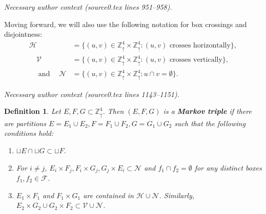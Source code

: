 \documentclass[10pt,a4paper]{amsart}
\newcommand{\X}{\times}
\newcommand{\Zd}{\mathds{Z}^4_\uparrow}
\newcommand{\mathand}{\;\text{and}\;}
\newcommand{\scrF}{\mathcal{F}}
\newcommand{\scrH}{\mathcal{H}}
\newcommand{\scrN}{\mathcal{N}}
\newcommand{\sset}{\subset}
\newtheorem{definition}{Definition}
\newcommand{\scrV}{\mathcal{V}}
\begin{document}
\par\medskip\noindent\textit{Necessary author context (source0.tex lines 951--958).}\par\smallskip
Moving forward, we will also use the following notation for box crossings and disjointness:
\begin{equation*}
\begin{split}
\scrH &= \{(u, v) \in \Zd \X \Zd: (u, v) \text{ crosses horizontally}\}, \\
\quad \scrV &= \{(u, v) \in \Zd \X \Zd: (u, v) \text{ crosses vertically}\}, \\ \quad \mathand \quad
\scrN &= \{(u, v) \in \Zd \X \Zd : u \cap v = \emptyset \}.
\end{split}
\end{equation*}

\par\medskip\noindent\textit{Necessary author context (source0.tex lines 1143--1151).}\par\smallskip
\begin{definition}
	\label{D:crossing-triple}
	Let $E, F, G \sset \Zd$. Then $(E, F, G)$ is a \textbf{Markov triple} if there are partitions $E = E_1 \cup E_2, F = F_1 \cup F_2, G = G_1 \cup G_2$ such that the following conditions hold:
	\begin{enumerate}[nosep, label=(\roman*)]
		\item $\sqcup E \cap \sqcup G \sset \sqcup F$.
		\item For $i \ne j$, $E_i \X F_j, F_i \X G_j, G_j \X E_i \sset \scrN$ and $f_1 \cap f_2 = \emptyset$ for any distinct boxes $f_1, f_2 \in \scrF$.
		\item $E_1 \X F_1$ and $F_1 \X G_1$ are contained in $\scrH \cup \scrN$. Similarly, $E_2 \X G_2 \cup G_2 \X F_2 \sset \scrV \cup \scrN$.
	\end{enumerate}
\end{definition}
\end{document}
